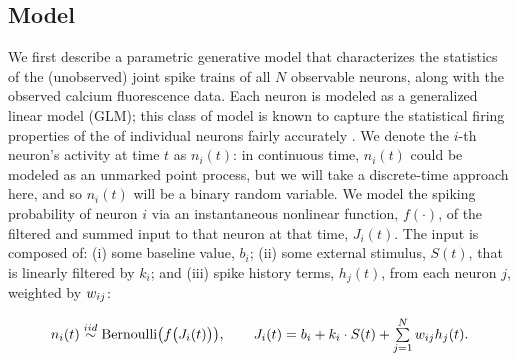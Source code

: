 \long{}


\subsection{Model} \label{sec:methods:markov-setup} We first describe a parametric generative model that characterizes the statistics of the (unobserved) joint spike trains of all $N$ observable neurons, along with the observed calcium fluorescence data. Each neuron is modeled as a generalized linear model (GLM); this class of model is known to capture the statistical firing properties of the of individual neurons fairly accurately \cite{BRIL88,CSK88,BRIL92,PG00,PILL07,PAN03d,PAN04c,Rigat06,TRUC05,NYK06,KP06,Vidne08,Stevenson2009}. We denote the $i$-th neuron's activity at time $t$ as $n_i(t)$: in continuous time, $n_i(t)$ could be modeled as an unmarked point process, but we will take a discrete-time approach here, and so $n_i(t)$ will be a binary random variable. We model the spiking probability of neuron $i$ via an instantaneous nonlinear function, $f(\cdot)$, of the filtered and summed input to that neuron at that time, $J_i(t)$. The input is composed of: (i) some baseline value, $b_i$; (ii) some external stimulus, $S(t)$, that is linearly filtered by $k_i$; and (iii) spike history terms, $h_j(t)$, from each neuron $j$, weighted by $w_{ij}$:

\begin{equation} \label{eqn:glm:definition}
\begin{array}{l}
n_i(t)\overset{iid}{\sim} \text{Bernoulli}\big(f\big(J_i(t) \big)
\big), \qquad J_i(t)=b_i+k_i\cdot S(t)+\sum \limits_{j=1}^{N} \w_{ij}
h_{j}(t).
\end{array}
\end{equation}

